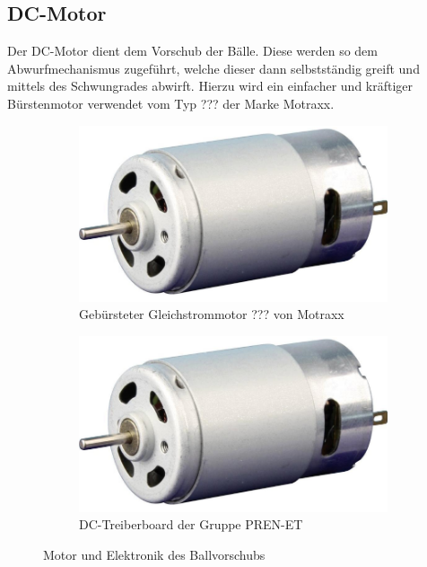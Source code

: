 \subsection{DC-Motor}
Der DC-Motor dient dem Vorschub der Bälle. Diese werden so dem
Abwurfmechanismus zugeführt, welche dieser dann selbstständig
greift und mittels des Schwungrades abwirft. Hierzu wird ein
einfacher und kräftiger Bürstenmotor verwendet vom Typ ???
der Marke Motraxx.

\begin{figure}[h!]
	\centering
	\begin{subfigure}[b]{0.45\textwidth}
		\centering
		\includegraphics[width=1\textwidth]{../../fig/et/dc_01.png}
		\caption{Gebürsteter Gleichstrommotor ??? von Motraxx}
	\end{subfigure}
	\begin{subfigure}[b]{0.45\textwidth}
		\centering
		\includegraphics[width=1\textwidth]{../../fig/et/dc_01.png}
		\caption{DC-Treiberboard der Gruppe PREN-ET}
	\end{subfigure}
	\caption{Motor und Elektronik des Ballvorschubs}
\end{figure}

